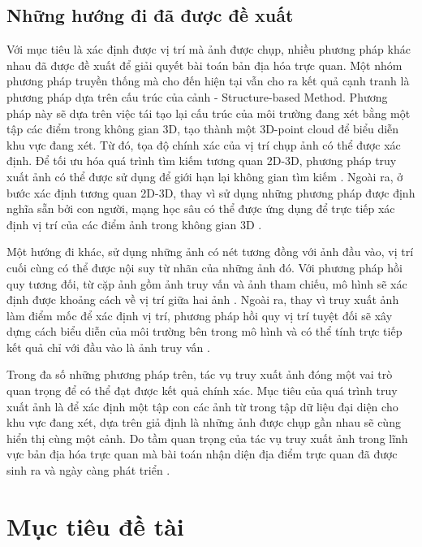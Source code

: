 \subsection{Những hướng đi đã được đề xuất}

Với mục tiêu là xác định được vị trí mà ảnh được chụp, nhiều phương pháp khác nhau đã được đề xuất để giải quyết bài toán bản địa hóa trực quan. Một nhóm phương pháp truyền thống mà cho đến hiện tại vẫn cho ra kết quả cạnh tranh là phương pháp dựa trên cấu trúc của cảnh - Structure-based Method. Phương pháp này sẽ dựa trên việc tái tạo lại cấu trúc của môi trường đang xét bằng một tập các điểm trong không gian 3D, tạo thành một 3D-point cloud để biểu diễn khu vực đang xét. Từ đó, tọa độ chính xác của vị trí chụp ảnh có thể được xác định. Để tối ưu hóa quá trình tìm kiếm tương quan 2D-3D, phương pháp truy xuất ảnh có thể được sử dụng để giới hạn lại không gian tìm kiếm \cite{sarlin2019coarse}. Ngoài ra, ở bước xác định tương quan 2D-3D, thay vì sử dụng những phương pháp được định nghĩa sẵn bởi con người, mạng học sâu có thể được ứng dụng để trực tiếp xác định vị trí của các điểm ảnh trong không gian 3D \cite{brachmann2021visual}. 

Một hướng đi khác, sử dụng những ảnh có nét tương đồng với ảnh đầu vào, vị trí cuối cùng có thể được nội suy từ nhãn của những ảnh đó. Với phương pháp hồi quy tương đối, từ cặp ảnh gồm ảnh truy vấn và ảnh tham chiếu, mô hình sẽ xác định được khoảng cách về vị trí giữa hai ảnh \cite{zhou2020learn}. Ngoài ra, thay vì truy xuất ảnh làm điểm mốc để xác định vị trí, phương pháp hồi quy vị trí tuyệt đối sẽ xây dựng cách biểu diễn của môi trường bên trong mô hình và có thể tính trực tiếp kết quả chỉ với đầu vào là ảnh truy vấn \cite{kendall2016posenet}.

Trong đa số những phương pháp trên, tác vụ truy xuất ảnh đóng một vai trò quan trọng để có thể đạt được kết quả chính xác. Mục tiêu của quá trình truy xuất ảnh là để xác định một tập con các ảnh từ trong tập dữ liệu đại diện cho khu vực đang xét, dựa trên giả định là những ảnh được chụp gần nhau sẽ cùng hiển thị cùng một cảnh. Do tầm quan trọng của tác vụ truy xuất ảnh trong lĩnh vực bản địa hóa trực quan mà bài toán nhận diện địa điểm trực quan đã được sinh ra và ngày càng phát triển \cite{berton2022rethinking}\cite{keetha2023anyloc}\cite{alibey2023mixvpr}.

\section{Mục tiêu đề tài}

